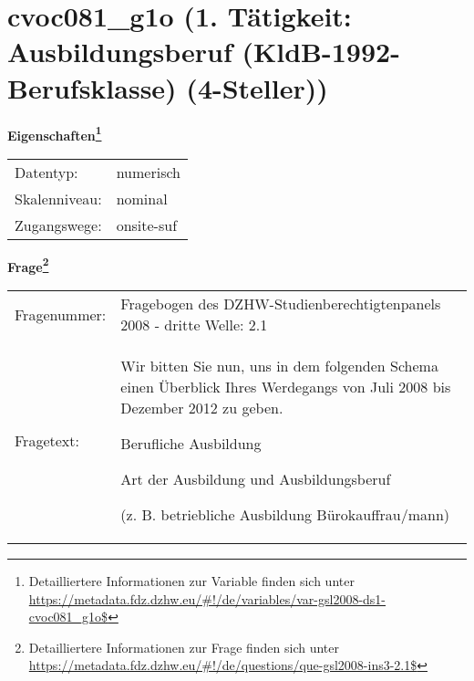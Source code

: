 
    \setcounter{footnote}{0}

    \vspace*{-1.8cm}
	\section{cvoc081\_g1o (1. Tätigkeit: Ausbildungsberuf (KldB-1992-Berufsklasse) (4-Steller))}
	\label{section:cvoc081_g1o}



    \vspace*{0.5cm}
    \noindent\textbf{Eigenschaften\footnote{Detailliertere Informationen zur Variable finden sich unter
		\url{https://metadata.fdz.dzhw.eu/\#!/de/variables/var-gsl2008-ds1-cvoc081_g1o$}}}\\
	\begin{tabularx}{\hsize}{@{}lX}
	Datentyp: & numerisch \\
	Skalenniveau: & nominal \\
	Zugangswege: &
	  onsite-suf
 \\
    \end{tabularx}



				\vspace*{0.5cm}
                \noindent\textbf{Frage\footnote{Detailliertere Informationen zur Frage finden sich unter
		              \url{https://metadata.fdz.dzhw.eu/\#!/de/questions/que-gsl2008-ins3-2.1$}}}\\
				\begin{tabularx}{\hsize}{@{}lX}
					Fragenummer: &
					  Fragebogen des DZHW-Studienberechtigtenpanels 2008 - dritte Welle:
					  2.1
 \\
					Fragetext: & Wir bitten Sie nun, uns in dem folgenden Schema einen Überblick Ihres Werdegangs von Juli 2008 bis Dezember 2012 zu geben.\par  Berufliche Ausbildung\par  Art der Ausbildung und Ausbildungsberuf\par  (z. B. betriebliche Ausbildung Bürokauffrau/mann) \\
				\end{tabularx}





